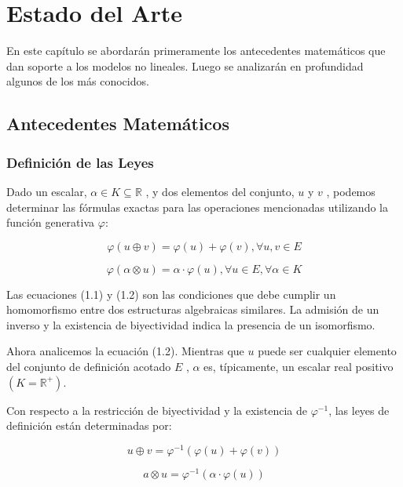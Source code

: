 \chapter{Estado del Arte}\label{chapter:state-of-the-art}

En este cap\'itulo se abordar\'an primeramente los antecedentes matem\'aticos que dan soporte a los modelos no lineales. Luego se analizar\'an en profundidad algunos de los m\'as conocidos.

\section{Antecedentes Matemáticos}

\subsection{Definición de las Leyes}

Dado un escalar, $\alpha \in K \subseteq \mathbb{R}$ , y dos elementos del conjunto, $u$ y $v$ , podemos determinar las fórmulas exactas para las operaciones mencionadas utilizando la función generativa $\varphi$:

\begin{equation}
	\varphi(u\oplus v) = \varphi(u)+\varphi(v), \forall u,v \in E
\end{equation}

\begin{equation}
	\varphi(\alpha \otimes u) = \alpha \cdot \varphi(u), \forall u \in E, \forall \alpha \in K
\end{equation}

Las ecuaciones (1.1) y (1.2) son las condiciones que debe cumplir un homomorfismo entre dos estructuras algebraicas similares. La admisi\'on de un inverso y la existencia de biyectividad indica la presencia de un isomorfismo.

Ahora analicemos la ecuación (1.2). Mientras que $u$ puede ser cualquier elemento del conjunto de definici\'on acotado $E$ , $\alpha$ es, típicamente, un escalar real positivo $(K=\mathbb{R}^+)$.

Con respecto a la restricción de biyectividad y la existencia de $\varphi^{-1}$, las leyes de definición están determinadas por:

\begin{equation}
	u \oplus v = \varphi^{-1}(\varphi(u)+\varphi(v))	
\end{equation}

\begin{equation}	
	a \otimes u = \varphi^{-1}(\alpha\cdot\varphi(u))
\end{equation} 

